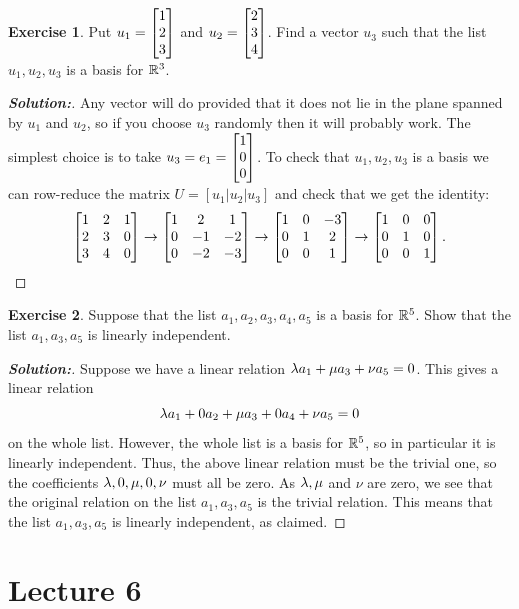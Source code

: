 \documentclass[a4paper]{amsart}
\theoremstyle{definition}
\newtheorem{exercise}{Exercise}
\newenvironment{solution}{\begin{proof}[\textbf{Solution:}] \vphantom{u}}{\end{proof}}
\begin{document}
\begin{exercise}\label{ex-basis-iii}
 Put $u_1=\left[\begin{matrix} 1\\2\\3\end{matrix}\right]$ and $u_2=\left[\begin{matrix} 2\\3\\4\end{matrix}\right]$.  Find a vector
 $u_3$ such that the list $u_1,u_2,u_3$ is a basis for ${\mathbb{R}}^3$.
\end{exercise}
\begin{solution}
 Any vector will do provided that it does not lie in the plane spanned
 by $u_1$ and $u_2$, so if you choose $u_3$ randomly then it will
 probably work.  The simplest choice is to take
 $u_3=e_1=\left[\begin{matrix} 1\\0\\0\end{matrix}\right]$.  To check that $u_1,u_2,u_3$ is a basis
 we can row-reduce the matrix $U=[u_1|u_2|u_3]$ and check that we get
 the identity:
 \[ 
  \left[\begin{matrix} 1 & 2 & 1 \\
       2 & 3 & 0 \\
       3 & 4 & 0 \end{matrix}\right] 
  \to 
  \left[\begin{matrix} 1 & 2 & 1 \\
       0 &-1 &-2 \\
       0 &-2 &-3 \end{matrix}\right] 
  \to 
  \left[\begin{matrix} 1 & 0 &-3 \\
       0 & 1 & 2 \\
       0 & 0 & 1 \end{matrix}\right] 
  \to 
  \left[\begin{matrix} 1 & 0 & 0 \\
       0 & 1 & 0 \\
       0 & 0 & 1 \end{matrix}\right]. 
 \]
\end{solution}

\begin{exercise}\label{ex-basis-iv}
 Suppose that the list $a_1,a_2,a_3,a_4,a_5$ is a basis for ${\mathbb{R}}^5$.
 Show that the list $a_1,a_3,a_5$ is linearly independent.
\end{exercise}
\begin{solution}
 Suppose we have a linear relation $\lambda a_1 + \mu a_3 + \nu a_5=0$.
 This gives a linear relation
 \[ \lambda a_1 + 0 a_2 + \mu a_3 + 0 a_4 + \nu a_5 = 0 \]
 on the whole list.  However, the whole list is a basis for ${\mathbb{R}}^5$, so
 in particular it is linearly independent.  Thus, the above linear
 relation must be the trivial one, so the coefficients
 $\lambda,0,\mu,0,\nu$ must all be zero.  As $\lambda,\mu$ and $\nu$ are
 zero, we see that the original relation on the list $a_1,a_3,a_5$ is
 the trivial relation.  This means that the list $a_1,a_3,a_5$ is
 linearly independent, as claimed.
\end{solution}

\section{Lecture 6}
\end{document}
